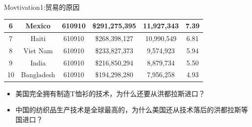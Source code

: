 \documentclass[10pt,hyperref={CJKbookmarks=true},xcolor=dvipsnames,aspectratio=169]{beamer}
\begin{document}
\begin{frame}{Movtivation1:贸易的原因}
\begin{table}[2017年美国T恤衫进口]
\begin{tabular}{c|c|c|c|c|c}
		6                        & Mexico                          & 610910                        & \$291,275,395                        & 11,927,343                        & 7.39                         \\ \hline
		7                        & Haiti                           & 610910                        & \$268,398,127                        & 10,990,549                        & 6.81                         \\ \hline
		8                        & Viet Nam                        & 610910                        & \$233,827,373                        & 9,574,923                         & 5.94                         \\ \hline
		9                        & India                           & 610910                        & \$216,850,294                        & 8,879,734                         & 5.50                         \\ \hline
		10                       & Bangladesh                      & 610910                        & \$194,298,280                        & 7,956,258                         & 4.93                         \\ \hline
	\end{tabular}
\end{table}
  \begin{itemize}
  	\item 美国完全拥有制造T恤衫的技术，为什么还要从洪都拉斯进口？
  	\item 中国的纺织品生产技术是全球最高的，为什么美国还从技术落后的洪都拉斯等国进口？
  \end{itemize}
\end{frame}
\end{document}
